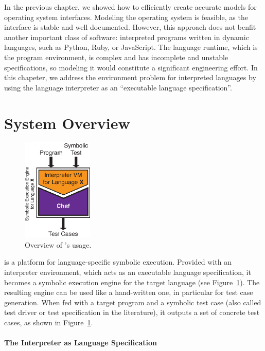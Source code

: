 In the previous chapter, we showed how to efficiently create accurate models for operating system interfaces.  Modeling the operating system is feasible, as the interface is stable and well documented.
%
However, this approach does not benfit another important class of software: interpreted programs written in dynamic languages, such as Python, Ruby, or JavaScript.
%
The language runtime, which is the program environment, is complex and has incomplete and unstable specifications, so modeling it would constitute a significant engineering effort.
%
In this chapeter, we address the environment problem for interpreted languages by using the language interpreter as an ``executable language specification''.

\section{System Overview}

\begin{figure}
  \centering
  \includegraphics[width=0.3\textwidth]{figures/chef/usage-model}
  \caption{Overview of \chef's usage.}
  \label{fig:chef:overview}
\end{figure}

\chef is a platform for language-specific symbolic execution.
%
Provided with an interpreter environment, which acts as an executable language specification, it becomes a symbolic execution engine for the target language (see Figure~\ref{fig:chef:overview}).
%
The resulting engine can be used like a hand-written one, in particular for test case generation.  When fed with a target program and a symbolic test case (also called test driver or test specification in the literature), it outputs a set of concrete test cases, as shown in Figure~\ref{fig:chef:overview}.

\paragraph{The Interpreter as Language Specification}

